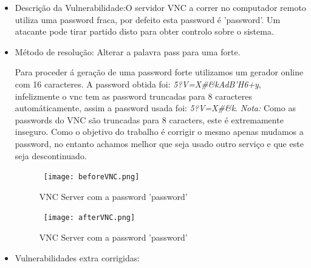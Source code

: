 \begin{itemize}
\item Descrição da Vulnerabilidade:O servidor VNC a correr no computador remoto utiliza uma password fraca, por defeito esta password é 'password'. Um atacante pode tirar partido disto para obter controlo sobre o sistema.

\item Método de resolução: Alterar a palavra pass para uma forte.
\par Para proceder á geração de uma password forte utilizamos um gerador online com 16 caracteres. A password obtida foi: \textit{5?V=X\#\&kAdB'H6+y}, infelizmente o vnc tem as password truncadas para 8 caracteres automáticamente, assim a password usada foi: \textit{5?V=X\#\&k}.\newline
\textit{Nota:} Como as passwords do VNC são truncadas para 8 caracters, este é extremamente inseguro. Como o objetivo do trabalho é corrigir o mesmo apenas mudamos a password, no entanto achamos melhor que seja usado outro serviço e que este seja descontinuado.
\begin{figure}[H]

  \centering

  \hbox{\hspace{-6em} \texttt{[image: beforeVNC.png]}}

  \caption {VNC Server com a password 'password'}

  \label {fig3}

\end{figure}
\begin{figure}[H]

  \centering

  \hbox{\hspace{-6em} \texttt{[image: afterVNC.png]}}

  \caption {VNC Server com a password 'password'}

  \label {fig3}

\end{figure}
\item Vulnerabilidades extra corrigidas:
\end{itemize}
